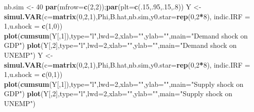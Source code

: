 \documentclass[
  11pt,
]{book}
\newenvironment{Shaded}{\begin{snugshade}}{\end{snugshade}}
\newcommand{\AttributeTok}[1]{\textcolor[rgb]{0.13,0.29,0.53}{#1}}
\newcommand{\DecValTok}[1]{\textcolor[rgb]{0.00,0.00,0.81}{#1}}
\newcommand{\FunctionTok}[1]{\textcolor[rgb]{0.13,0.29,0.53}{\textbf{#1}}}
\newcommand{\NormalTok}[1]{#1}
\newcommand{\OtherTok}[1]{\textcolor[rgb]{0.56,0.35,0.01}{#1}}
\newcommand{\SpecialCharTok}[1]{\textcolor[rgb]{0.81,0.36,0.00}{\textbf{#1}}}
\newcommand{\StringTok}[1]{\textcolor[rgb]{0.31,0.60,0.02}{#1}}
\theoremstyle{definition}
\theoremstyle{definition}
\theoremstyle{definition}
\theoremstyle{definition}
\theoremstyle{remark}
\begin{document}
\begin{Shaded}
\begin{Highlighting}[]
\NormalTok{nb.sim }\OtherTok{\textless{}{-}} \DecValTok{40}
\FunctionTok{par}\NormalTok{(}\AttributeTok{mfrow=}\FunctionTok{c}\NormalTok{(}\DecValTok{2}\NormalTok{,}\DecValTok{2}\NormalTok{));}\FunctionTok{par}\NormalTok{(}\AttributeTok{plt=}\FunctionTok{c}\NormalTok{(.}\DecValTok{15}\NormalTok{,.}\DecValTok{95}\NormalTok{,.}\DecValTok{15}\NormalTok{,.}\DecValTok{8}\NormalTok{))}
\NormalTok{Y }\OtherTok{\textless{}{-}} \FunctionTok{simul.VAR}\NormalTok{(}\AttributeTok{c=}\FunctionTok{matrix}\NormalTok{(}\DecValTok{0}\NormalTok{,}\DecValTok{2}\NormalTok{,}\DecValTok{1}\NormalTok{),Phi,B.hat,nb.sim,}\AttributeTok{y0.star=}\FunctionTok{rep}\NormalTok{(}\DecValTok{0}\NormalTok{,}\DecValTok{2}\SpecialCharTok{*}\DecValTok{8}\NormalTok{),}
               \AttributeTok{indic.IRF =} \DecValTok{1}\NormalTok{,}\AttributeTok{u.shock =} \FunctionTok{c}\NormalTok{(}\DecValTok{1}\NormalTok{,}\DecValTok{0}\NormalTok{))}
\FunctionTok{plot}\NormalTok{(}\FunctionTok{cumsum}\NormalTok{(Y[,}\DecValTok{1}\NormalTok{]),}\AttributeTok{type=}\StringTok{"l"}\NormalTok{,}\AttributeTok{lwd=}\DecValTok{2}\NormalTok{,}\AttributeTok{xlab=}\StringTok{""}\NormalTok{,}\AttributeTok{ylab=}\StringTok{""}\NormalTok{,}\AttributeTok{main=}\StringTok{"Demand shock on GDP"}\NormalTok{)}
\FunctionTok{plot}\NormalTok{(Y[,}\DecValTok{2}\NormalTok{],}\AttributeTok{type=}\StringTok{"l"}\NormalTok{,}\AttributeTok{lwd=}\DecValTok{2}\NormalTok{,}\AttributeTok{xlab=}\StringTok{""}\NormalTok{,}\AttributeTok{ylab=}\StringTok{""}\NormalTok{,}\AttributeTok{main=}\StringTok{"Demand shock on UNEMP"}\NormalTok{)}
\NormalTok{Y }\OtherTok{\textless{}{-}} \FunctionTok{simul.VAR}\NormalTok{(}\AttributeTok{c=}\FunctionTok{matrix}\NormalTok{(}\DecValTok{0}\NormalTok{,}\DecValTok{2}\NormalTok{,}\DecValTok{1}\NormalTok{),Phi,B.hat,nb.sim,}\AttributeTok{y0.star=}\FunctionTok{rep}\NormalTok{(}\DecValTok{0}\NormalTok{,}\DecValTok{2}\SpecialCharTok{*}\DecValTok{8}\NormalTok{),}
               \AttributeTok{indic.IRF =} \DecValTok{1}\NormalTok{,}\AttributeTok{u.shock =} \FunctionTok{c}\NormalTok{(}\DecValTok{0}\NormalTok{,}\DecValTok{1}\NormalTok{))}
\FunctionTok{plot}\NormalTok{(}\FunctionTok{cumsum}\NormalTok{(Y[,}\DecValTok{1}\NormalTok{]),}\AttributeTok{type=}\StringTok{"l"}\NormalTok{,}\AttributeTok{lwd=}\DecValTok{2}\NormalTok{,}\AttributeTok{xlab=}\StringTok{""}\NormalTok{,}\AttributeTok{ylab=}\StringTok{""}\NormalTok{,}\AttributeTok{main=}\StringTok{"Supply shock on GDP"}\NormalTok{)}
\FunctionTok{plot}\NormalTok{(Y[,}\DecValTok{2}\NormalTok{],}\AttributeTok{type=}\StringTok{"l"}\NormalTok{,}\AttributeTok{lwd=}\DecValTok{2}\NormalTok{,}\AttributeTok{xlab=}\StringTok{""}\NormalTok{,}\AttributeTok{ylab=}\StringTok{""}\NormalTok{,}\AttributeTok{main=}\StringTok{"Supply shock on UNEMP"}\NormalTok{)}
\end{Highlighting}
\end{Shaded}
\end{document}
